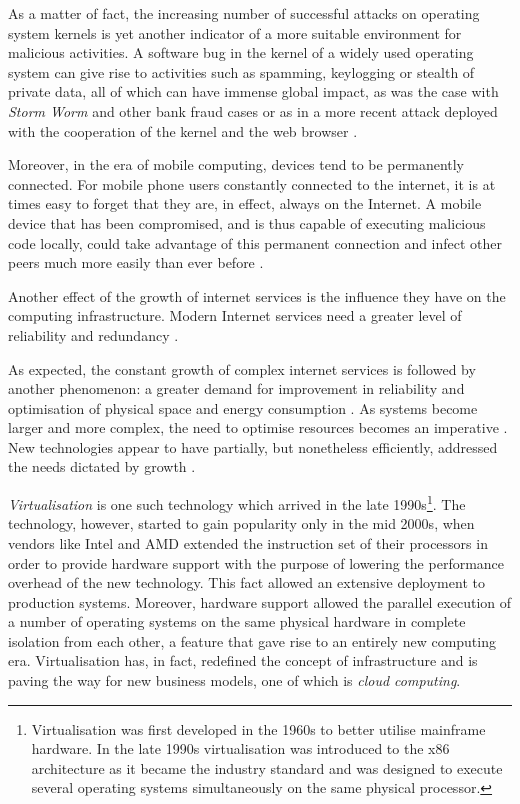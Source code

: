 As a matter of fact, the increasing number of successful attacks on operating system kernels is yet another indicator of a more suitable environment for malicious activities. A software bug in the kernel of a widely used operating system can give rise to activities such as spamming, keylogging or stealth of private data, all of which can have immense global impact, as was the case with \emph{Storm Worm} \cite{1387718} and other bank fraud cases \cite{mcaffee} or as in a more recent attack deployed with the cooperation of the kernel and the web browser \cite{rootkit64, rootkit64anal}.

Moreover, in the era of mobile computing, devices tend to be permanently connected. For mobile phone users constantly connected to the internet, it is at times easy to forget that they are, in effect, always on the Internet. A mobile device that has been compromised, and is thus capable of executing malicious code locally, could take advantage of this permanent connection and infect other peers much more easily than ever before \cite{avg, Vidas, androidmalware}.

Another effect of the growth of internet services is the influence they have on the computing infrastructure. Modern Internet services need a greater level of reliability and redundancy \cite{6203493, citeulike:10297687, europecloud}. 

As expected, the constant growth of complex internet services is followed by another phenomenon: a greater demand for improvement in reliability and optimisation of physical space and energy consumption \cite{litegreen, Beloglazov:2010:EER:1844765.1845139, Buyya_energy-efficientmanagement}. As systems become larger and more complex, the need to optimise resources becomes an imperative \cite{DBLP:conf/iscis/QuanBMLMSMTD11}. New technologies appear to have partially, but nonetheless efficiently, addressed the needs dictated by growth \cite{5474725, 5710870, Malakuti:2012:TMR:2161996.2162001, 5558007, CPE:CPE2972} .

\emph{Virtualisation} is one such technology which arrived in the late 1990s\footnote{Virtualisation was first developed in the 1960s to better utilise mainframe hardware. In the late 1990s virtualisation was introduced to the x86 architecture as it became the industry standard \cite{Rosenblum:2004:RVM:1016998.1017000} and was designed to execute several operating systems simultaneously on the same physical processor.}.
The technology, however, started to gain popularity only in the mid 2000s, when vendors like Intel and AMD extended the instruction set of their processors in order to provide hardware support with the purpose of lowering the performance overhead of the new technology. This fact allowed an extensive deployment to production systems. Moreover, hardware support allowed the parallel execution of a number of operating systems on the same physical hardware in complete isolation from each other, a feature that gave rise to an entirely new computing era. 
Virtualisation has, in fact, redefined the concept of infrastructure and is paving the way for new business models, one of which is \emph{cloud computing}\cite{Buyya:2011:CCP:1971955}.

